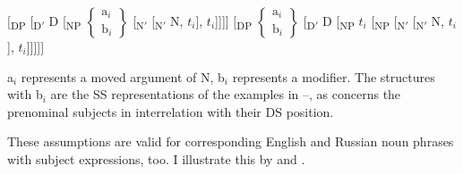 \documentclass[output=paper,colorlinks,citecolor=brown]{langscibook}
\begin{document}
\ea \label{ex:zi91:59} 
    \ea \label{ex:zi91:59a} $[$\textsubscript{DP} [\textsubscript{D$'$} D [\textsubscript{NP} $\left\{ \begin{array}{c} \text{a}_{i} \\ \text{b}_{i} \end{array} \right\}$ [\textsubscript{N$'$} [\textsubscript{N$'$} N, $t_i$], $t_i$]]]]
    \ex \label{ex:zi91:59b} $[$\textsubscript{DP} $\left\{ \begin{array}{c} \text{a}_{i} \\ \text{b}_{i} \end{array} \right\}$ [\textsubscript{D$'$} D [\textsubscript{NP} $t_i$ [\textsubscript{NP} [\textsubscript{N$'$} [\textsubscript{N$'$} N, $t_i$], $t_i$]]]]]
    \z
\z

\noindent a$_i$ represents a moved argument of N, b$_i$ represents a modifier. The structures with b$_i$ are the SS representations of the examples in --, as concerns the prenominal subjects in interrelation with their DS position.

These assumptions are valid for corresponding English and Russian noun phra\-ses with subject expressions, too. I illustrate this by  and .
\end{document}
